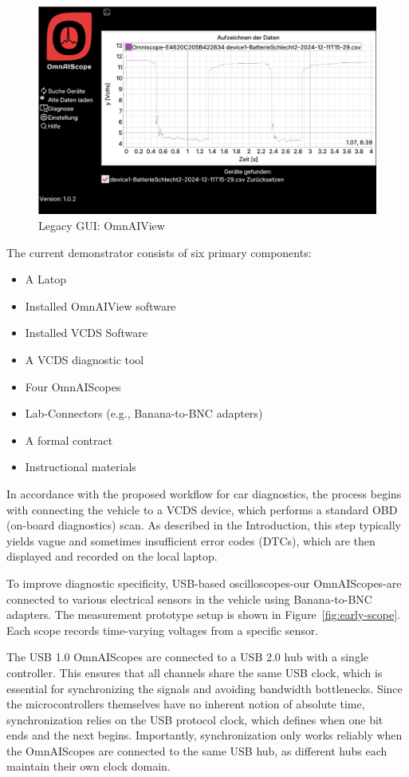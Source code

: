 \begin{figure}[ht]
  \centering
  \includegraphics[width=0.8\linewidth]{figures/legacy_gui.png}
  \caption{Legacy GUI: OmnAIView}
  \label{fig:gui}
\end{figure}

The current demonstrator consists of six primary components:
\begin{itemize}
  \item A Latop
  \item Installed OmnAIView software
  \item Installed VCDS Software
  \item A VCDS diagnostic tool
  \item Four OmnAIScopes
  \item Lab-Connectors (e.g., Banana-to-BNC adapters)
  \item A formal contract
  \item Instructional materials
\end{itemize}
In accordance with the proposed workflow for car diagnostics, the process begins with connecting the vehicle to a VCDS device, which performs a standard OBD (on-board diagnostics) scan. 
As described in the Introduction, this step typically yields vague and sometimes insufficient error codes (DTCs), which are then displayed and recorded on the local laptop.

To improve diagnostic specificity, USB-based oscilloscopes-our OmnAIScopes-are connected to various electrical sensors in the vehicle using Banana-to-BNC adapters. 
The measurement prototype setup is shown in Figure~\ref{fig:early-scope}.
Each scope records time-varying voltages from a specific sensor. 

The USB 1.0 OmnAIScopes are connected to a USB 2.0 hub with a single controller. 
This ensures that all channels share the same USB clock, which is essential for synchronizing the signals and avoiding bandwidth bottlenecks. 
Since the microcontrollers themselves have no inherent notion of absolute time, synchronization relies on the USB protocol clock, which defines when one bit ends and the next begins. 
Importantly, synchronization only works reliably when the OmnAIScopes are connected to the same USB hub, as different hubs each maintain their own clock domain.

